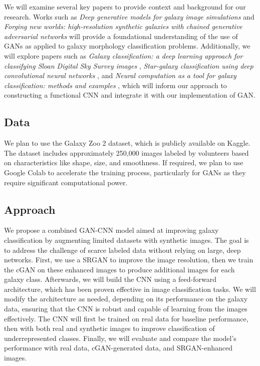 We will examine several key papers to provide context and background for our research. 
Works such as \textit{Deep generative models for galaxy image simulations} \cite{Lanusse21} and 
\textit{Forging new worlds: high-resolution synthetic galaxies with chained generative adversarial networks} \cite{Fussell19} 
will provide a foundational understanding of the use of GANs as applied to galaxy morphology classification problems. 
Additionally, we will explore papers such as \textit{Galaxy classification: a deep learning approach for classifying Sloan Digital Sky Survey images} \cite{Gharat22}, 
\textit{Star-galaxy classification using deep convolutional neural networks} \cite{Kim16},
and \textit{Neural computation as a tool for galaxy classification: methods and examples} \cite{Lahav96}, 
which will inform our approach to constructing a functional CNN and integrate it with our implementation of GAN.

\subsection{Data}
We plan to use the Galaxy Zoo 2 dataset, which is publicly available on Kaggle. 
The dataset includes approximately 250,000 images labeled by volunteers based on characteristics like shape, size, and smoothness. 
If required, we plan to use Google Colab to accelerate the training process, particularly for GANs as they require significant computational power.


\subsection{Approach}
We propose a combined GAN-CNN model aimed at improving galaxy classification by augmenting limited datasets with synthetic images. 
The goal is to address the challenge of scarce labeled data without relying on large, deep networks.
First, we use a SRGAN to improve the image resolution, then we train the cGAN on these enhanced images to produce additional images for each galaxy class. 
Afterwards, we will build the CNN using a feed-forward architecture, which has been proven effective in image classification tasks. 
We will modify the architecture as needed, depending on its performance on the galaxy data, ensuring that the CNN is robust and capable of learning from the images effectively. 
The CNN will first be trained on real data for baseline performance, then with both real and synthetic images to improve classification of underrepresented classes.  
Finally, we will evaluate and compare the model's performance with real data, cGAN-generated data, and SRGAN-enhanced images.


